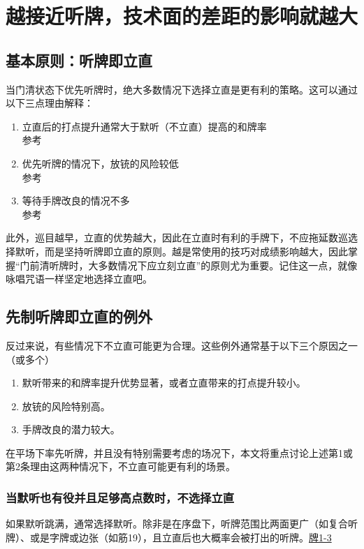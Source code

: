 \chapter[【听牌的技术】立直的判断]{越接近听牌，技术面的差距的影响就越大}
\label{lecture2}

\section{基本原则：听牌即立直}
当门清状态下优先听牌时，绝大多数情况下选择立直是更有利的策略。这可以通过以下三点理由解释：
\begin{enumerate}
    \item 立直后的打点提升通常大于默听（不立直）提高的和牌率\\
          参考
    \item 优先听牌的情况下，放铳的风险较低\\
          参考
    \item 等待手牌改良的情况不多\\
          参考
\end{enumerate}
此外，巡目越早，立直的优势越大，因此在立直时有利的手牌下，不应拖延数巡选择默听，而是坚持听牌即立直的原则。越是常使用的技巧对成绩影响越大，因此掌握“门前清听牌时，大多数情况下应立刻立直”的原则尤为重要。记住这一点，就像咏唱咒语一样坚定地选择立直吧。

\section{先制听牌即立直的例外}
反过来说，有些情况下不立直可能更为合理。这些例外通常基于以下三个原因之一（或多个）
\begin{enumerate}
    \item 默听带来的和牌率提升优势显著，或者立直带来的打点提升较小。
    \item 放铳的风险特别高。
    \item 手牌改良的潜力较大。
\end{enumerate}

在平场下率先听牌，并且没有特别需要考虑的场况下，本文将重点讨论上述第1或第2条理由这两种情况下，不立直可能更有利的场景。

\subsection{当默听也有役并且足够高点数时，不选择立直}
如果默听跳满，通常选择默听。除非是在序盘下，听牌范围比两面更广（如复合听牌）、或是字牌或边张（如筋19），且立直后也大概率会被打出的听牌。\hyperref[lec2:pai1-3]{牌1-3}


